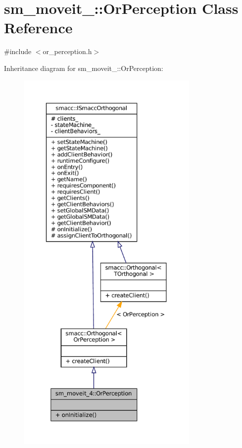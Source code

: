 \hypertarget{classsm__moveit__4_1_1OrPerception}{}\section{sm\+\_\+moveit\+\_\+:\+:Or\+Perception Class Reference}
\label{classsm__moveit__4_1_1OrPerception}


{\ttfamily \#include $<$or\+\_\+perception.\+h$>$}



Inheritance diagram for sm\+\_\+moveit\+\_\+:\+:Or\+Perception\+:
\nopagebreak
\begin{figure}[H]
\begin{center}
\leavevmode
\includegraphics[height=550pt]{classsm__moveit__4_1_1OrPerception__inherit__graph}
\end{center}
\end{figure}


